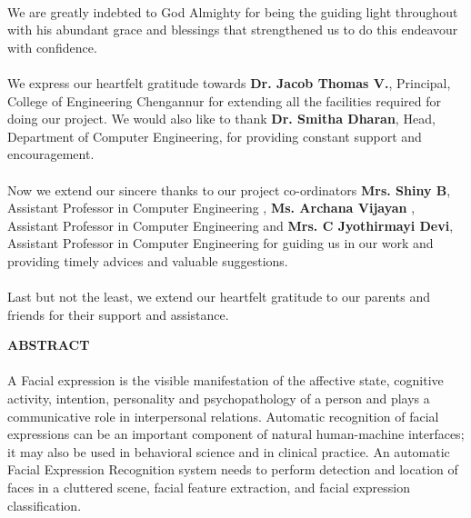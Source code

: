 \documentclass[a4paper,12pt,oneside]{article}
\begin{document}
\paragraph{}
We are greatly indebted to God Almighty for being the guiding light throughout with his
abundant grace and blessings that strengthened us to do this endeavour with confidence.
\paragraph{}
We express our heartfelt gratitude towards \textbf{Dr. Jacob Thomas V.}, Principal, College
of Engineering Chengannur for extending all the facilities required for doing our project.
We would also like to thank \textbf{Dr. Smitha Dharan}, Head, Department of Computer
Engineering, for providing constant support and encouragement.
\paragraph{}
Now we extend our sincere thanks to our project co-ordinators \textbf{Mrs. Shiny B}, Assistant
Professor in Computer Engineering , \textbf{Ms. Archana Vijayan} , Assistant
Professor in Computer Engineering and  \textbf{Mrs. C Jyothirmayi Devi}, Assistant Professor in Computer Engineering for guiding us in our work and providing timely advices and valuable suggestions.
\paragraph{}
Last but not the least, we extend our heartfelt gratitude to our parents and friends for
their support and assistance.	

\newpage

\begin{center}
\large{\textbf{ABSTRACT}}
\end{center}
\vspace{6ex}
\paragraph{}
﻿A Facial expression is the visible manifestation of the affective state, cognitive activity,
intention, personality and psychopathology of a person and plays a communicative role in
interpersonal relations. Automatic recognition of facial expressions can be an important
component of  natural  human-machine  interfaces;  it  may  also  be  used  in behavioral  science
and  in  clinical  practice. An automatic Facial Expression Recognition system needs to perform
detection and location of faces in a cluttered scene, facial feature extraction, and facial
expression classification.
\end{document}
